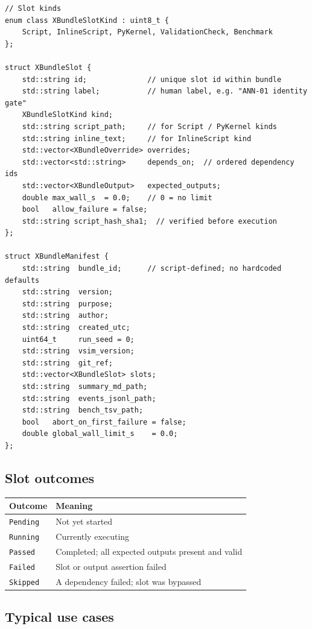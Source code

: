 ﻿\documentclass[11pt,a4paper]{article}
\begin{document}
\begin{lstlisting}
// Slot kinds
enum class XBundleSlotKind : uint8_t {
    Script, InlineScript, PyKernel, ValidationCheck, Benchmark
};

struct XBundleSlot {
    std::string id;              // unique slot id within bundle
    std::string label;           // human label, e.g. "ANN-01 identity gate"
    XBundleSlotKind kind;
    std::string script_path;     // for Script / PyKernel kinds
    std::string inline_text;     // for InlineScript kind
    std::vector<XBundleOverride> overrides;
    std::vector<std::string>     depends_on;  // ordered dependency ids
    std::vector<XBundleOutput>   expected_outputs;
    double max_wall_s  = 0.0;    // 0 = no limit
    bool   allow_failure = false;
    std::string script_hash_sha1;  // verified before execution
};

struct XBundleManifest {
    std::string  bundle_id;      // script-defined; no hardcoded defaults
    std::string  version;
    std::string  purpose;
    std::string  author;
    std::string  created_utc;
    uint64_t     run_seed = 0;
    std::string  vsim_version;
    std::string  git_ref;
    std::vector<XBundleSlot> slots;
    std::string  summary_md_path;
    std::string  events_jsonl_path;
    std::string  bench_tsv_path;
    bool   abort_on_first_failure = false;
    double global_wall_limit_s    = 0.0;
};
\end{lstlisting}

\subsection*{Slot outcomes}

\begin{center}
\begin{tabularx}{\linewidth}{@{}lX@{}}
\toprule
\textbf{Outcome} & \textbf{Meaning} \\
\midrule
\texttt{Pending}  & Not yet started \\
\texttt{Running}  & Currently executing \\
\texttt{Passed}   & Completed; all expected outputs present and valid \\
\texttt{Failed}   & Slot or output assertion failed \\
\texttt{Skipped}  & A dependency failed; slot was bypassed \\
\bottomrule
\end{tabularx}
\end{center}

\subsection*{Typical use cases}
\end{document}
